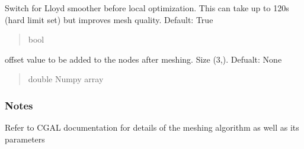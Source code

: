 \documentclass[letterpaper,10pt,english]{sphinxmanual}
\begin{document}
\begin{fulllineitems}
\begin{fulllineitems}
\begin{quote}
\begin{description}
\end{description}\end{quote}

\end{fulllineitems}


\begin{fulllineitems}
\label{\detokenize{_autosummary/nirfasterff.utils.MeshingParams:nirfasterff.utils.MeshingParams.lloyd_smooth}}
\pysigstartsignatures
\pysigline
{}
\pysigstopsignatures
\sphinxAtStartPar
Switch for Lloyd smoother before local optimization. This can take up to 120s (hard limit set) but improves mesh quality. Default: True
\begin{quote}\begin{description}
\sphinxAtStartPar
bool

\end{description}\end{quote}

\end{fulllineitems}


\begin{fulllineitems}
\label{\detokenize{_autosummary/nirfasterff.utils.MeshingParams:nirfasterff.utils.MeshingParams.offset}}
\pysigstartsignatures
\pysigline
{}
\pysigstopsignatures
\sphinxAtStartPar
offset value to be added to the nodes after meshing. Size (3,). Defualt: None
\begin{quote}\begin{description}
\sphinxAtStartPar
double Numpy array

\end{description}\end{quote}

\end{fulllineitems}

\subsubsection*{Notes}

\sphinxAtStartPar
Refer to CGAL documentation for details of the meshing algorithm as well as its parameters


\end{fulllineitems}
\end{document}
